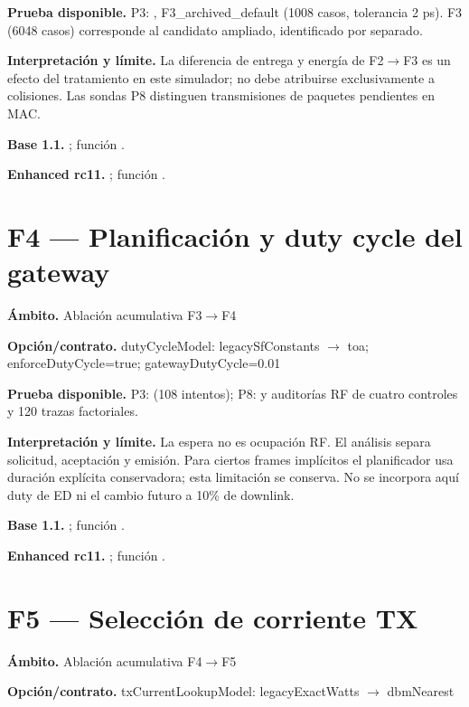 \documentclass[10pt,a4paper]{article}
\begin{document}
\textbf{Prueba disponible.} P3: , F3\_archived\_default (1008 casos, tolerancia 2 ps). F3 (6048 casos) corresponde al candidato ampliado, identificado por separado.

\textbf{Interpretación y límite.} La diferencia de entrega y energía de F2$\to$F3 es un efecto del tratamiento en este simulador; no debe atribuirse exclusivamente a colisiones. Las sondas P8 distinguen transmisiones de paquetes pendientes en MAC.

\textbf{Base 1.1.} ; función .\par
\textbf{Enhanced rc11.} ; función .\par
\section*{F4 — Planificación y duty cycle del gateway}
\textbf{Ámbito.} Ablación acumulativa F3$\to$F4

\textbf{Opción/contrato.} dutyCycleModel: legacySfConstants $\to$ toa; enforceDutyCycle=true; gatewayDutyCycle=0.01

\textbf{Prueba disponible.} P3:  (108 intentos); P8:  y auditorías RF de cuatro controles y 120 trazas factoriales.

\textbf{Interpretación y límite.} La espera no es ocupación RF. El análisis separa solicitud, aceptación y emisión. Para ciertos frames implícitos el planificador usa duración explícita conservadora; esta limitación se conserva. No se incorpora aquí duty de ED ni el cambio futuro a 10\% de downlink.

\textbf{Base 1.1.} ; función .\par
\textbf{Enhanced rc11.} ; función .\par
\section*{F5 — Selección de corriente TX}
\textbf{Ámbito.} Ablación acumulativa F4$\to$F5

\textbf{Opción/contrato.} txCurrentLookupModel: legacyExactWatts $\to$ dbmNearest
\end{document}
